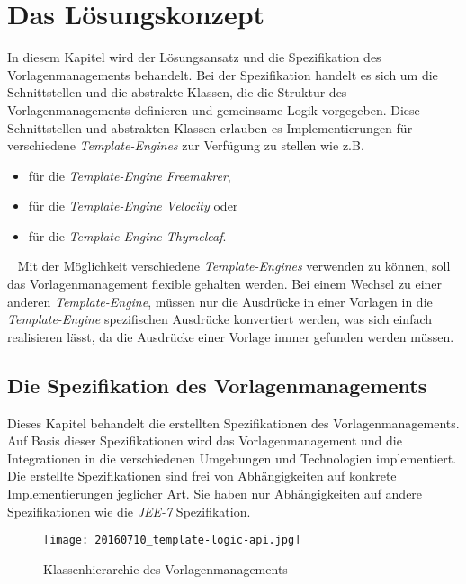 \chapter{Das Lösungskonzept}
\label{cha:Lösungskonzept}
In diesem Kapitel wird der Lösungsansatz und die Spezifikation des Vorlagenmanagements behandelt. Bei der Spezifikation handelt es sich um die Schnittstellen und die abstrakte Klassen, die die Struktur des Vorlagenmanagements definieren und gemeinsame Logik vorgegeben. Diese Schnittstellen und abstrakten Klassen erlauben es Implementierungen für verschiedene \emph{Template-Engines} zur Verfügung zu stellen wie z.B.
\begin{itemize}
	\item für die \emph{Template-Engine Freemakrer},
	\item für die \emph{Template-Engine Velocity} oder
	\item für die \emph{Template-Engine Thymeleaf}.
\end{itemize}
\ \newline
Mit der Möglichkeit verschiedene \emph{Template-Engines} verwenden zu können, soll das Vorlagenmanagement flexible gehalten werden. Bei einem Wechsel zu einer anderen \emph{Template-Engine}, müssen nur die Ausdrücke in einer Vorlagen in die \emph{Template-Engine} spezifischen Ausdrücke konvertiert werden, was sich einfach realisieren lässt, da die Ausdrücke einer Vorlage immer gefunden werden müssen.

\section{Die Spezifikation des Vorlagenmanagements}
\label{sec:specification-template-management}
Dieses Kapitel behandelt die erstellten Spezifikationen des Vorlagenmanagements. Auf Basis dieser Spezifikationen wird das Vorlagenmanagement und die Integrationen in die verschiedenen Umgebungen und Technologien implementiert. Die erstellte Spezifikationen sind frei von Abhängigkeiten auf konkrete Implementierungen jeglicher Art. Sie haben nur Abhängigkeiten auf andere Spezifikationen wie die \emph{JEE-7} Spezifikation.
\newpage

\begin{figure}[h]
\centering
\texttt{[image: 20160710\_template-logic-api.jpg]} %
\caption{Klassenhierarchie des Vorlagenmanagements}
\label{fig:template-logic-api-hierarchy}
\end{figure}

